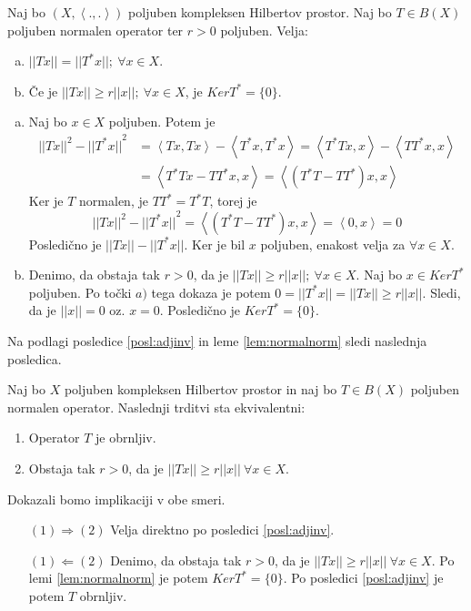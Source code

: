 \documentclass[mat2]{matdelo}
\newcommand{\abs}[1]{\ensuremath{\lvert #1 \rvert}}
\newcommand{\norm}[1]{\abs{\abs{#1}}}
\newcommand{\Sp}[2]{\ensuremath{\left<#1, #2\right>}}
\begin{document}
			\begin{lema}
				\label{lem:normalnorm}
				Naj bo $(X, \Sp{.}{.})$ poljuben kompleksen Hilbertov prostor. Naj bo $T\in B(X)$ poljuben normalen operator ter $r > 0$ poljuben. Velja: \begin{enumerate}[a)]
					\item $\norm{Tx} = \norm{T^*x};~\forall x\in X$.
					\item Če je $\norm{Tx} \geq r\norm{x};~\forall x\in X$, je $KerT^* = \{0\}$.
				\end{enumerate}
			\end{lema}
			\begin{dokaz}
				\begin{enumerate}[a)]
					\item Naj bo $x\in X$ poljuben. Potem je \begin{align*}
						\norm{Tx}^2 - \norm{T^*x}^2 &= \Sp{Tx}{Tx} - \Sp{T^*x}{T^*x} = \Sp{T^*Tx}{x} - \Sp{TT^*x}{x}\\
						&= \Sp{T^*Tx - TT^*x}{x} = \Sp{(T^*T - TT^*)x}{x}
					\end{align*}
					Ker je $T$ normalen, je $TT^* = T^*T$, torej je $$\norm{Tx}^2 - \norm{T^*x}^2 = \Sp{(T^*T - TT^*)x}{x} = \Sp{0}{x} = 0 $$
					Posledično je $\norm{Tx} - \norm{T^*x}$. Ker je bil $x$ poljuben, enakost velja za $\forall x\in X$.
					\item Denimo, da obstaja tak $r>0$, da je $\norm{Tx} \geq r\norm{x};~\forall x\in X$. Naj bo $x\in KerT^*$ poljuben. Po točki $a)$ tega dokaza je potem $0 = \norm{T^*x} = \norm{Tx} \geq r\norm{x}$. Sledi, da je $\norm{x} = 0$ oz. $x = 0$. Posledično je $KerT^* = \{0\}$.
				\end{enumerate}
			\end{dokaz}
			Na podlagi posledice \ref{posl:adjinv} in leme \ref{lem:normalnorm} sledi naslednja posledica.
			\begin{posledica}
				\label{posl:normalinv}
				Naj bo $X$ poljuben kompleksen Hilbertov prostor in naj bo $T\in B(X)$ poljuben normalen operator. Naslednji trditvi sta ekvivalentni: \begin{enumerate}
					\item Operator $T$ je obrnljiv.
					\item Obstaja tak $r > 0$, da je $\norm{Tx} \geq r\norm{x}~\forall x\in X$.
				\end{enumerate}
			\end{posledica}
			\begin{dokaz}
				Dokazali bomo implikaciji v obe smeri.
				\begin{itemize}
					\item[$(1)\Rightarrow (2)$] Velja direktno po posledici \ref{posl:adjinv}.
					\item[$(1)\Leftarrow (2)$] Denimo, da obstaja tak $r>0$, da je $\norm{Tx} \geq r\norm{x}~\forall x\in X$. Po lemi \ref{lem:normalnorm} je potem $KerT^* = \{0\}$. Po posledici \ref{posl:adjinv} je potem $T$ obrnljiv.
				\end{itemize}
			\end{dokaz}
\end{document}
